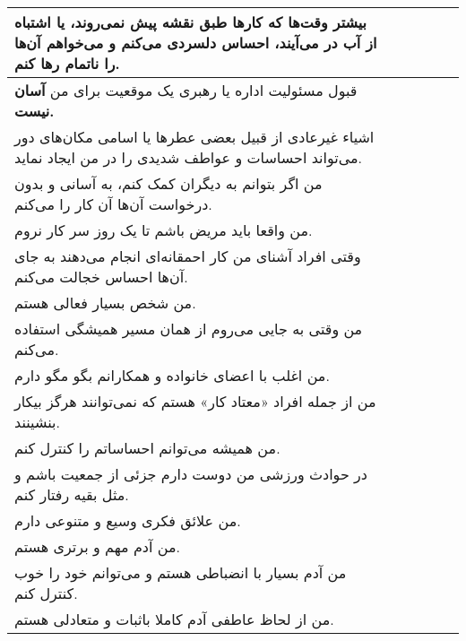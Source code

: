 \documentclass[a4paper,10pt]{article}
\begin{document}
\begin{center}
\begin{tabular}{|p{6cm}|c|c|c|c|c|}
بیشتر وقت‌ها که کارها طبق نقشه پیش نمی‌روند، یا اشتباه از آب در می‌آیند، احساس دلسردی می‌کنم و می‌خواهم آن‌ها را ناتمام رها کنم.& & & & & \\
\hline


قبول مسئولیت اداره یا رهبری یک موقعیت برای من \textbf{آسان نیست.}& & & & & \\
\hline


اشیاء غیرعادی از قبیل بعضی عطرها یا اسامی مکان‌های  دور می‌تواند احساسات و عواطف شدیدی را در من ایجاد نماید.& & & & & \\
\hline


من اگر بتوانم به دیگران کمک کنم، به آسانی و بدون درخواست آن‌ها آن کار را می‌کنم.& & & & & \\
\hline

من واقعا باید مریض باشم تا یک روز سر کار نروم.& & & & & \\
\hline


وقتی افراد آشنای من کار احمقانه‌ای انجام می‌دهند به جای آن‌ها احساس خجالت می‌کنم.& & & & & \\
\hline


من شخص بسیار فعالی هستم.& & & & & \\
\hline


من وقتی به جایی می‌روم از همان مسیر همیشگی استفاده می‌کنم.& & & & & \\
\hline


من اغلب با اعضای خانواده و همکارانم بگو مگو دارم.& & & & & \\
\hline


من از جمله افراد «معتاد کار» هستم که نمی‌توانند هرگز بیکار بنشینند.& & & & & \\
\hline


من همیشه می‌توانم احساساتم را کنترل کنم.& & & & & \\
\hline


در حوادث ورزشی من دوست دارم جزئی از جمعیت باشم و مثل بقیه رفتار کنم.& & & & & \\
\hline


من علائق فکری وسیع و متنوعی دارم.& & & & & \\
\hline

من آدم مهم و برتری هستم.& & & & & \\
\hline


من آدم بسیار با انضباطی هستم و می‌توانم خود را خوب کنترل کنم.& & & & & \\
\hline


من از لحاظ عاطفی آدم کاملا باثبات و متعادلی هستم.& & & & & \\
\hline


\end{tabular}
\end{center}
\end{document}
